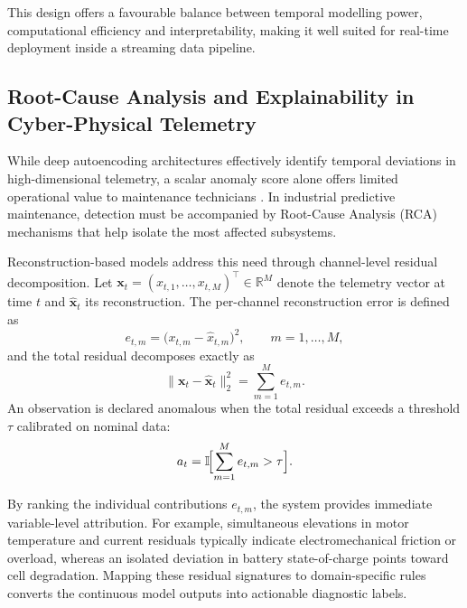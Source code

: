 This design offers a favourable balance between temporal modelling power, computational efficiency and interpretability, making it well suited for real-time deployment inside a streaming data pipeline.

\subsection{Root-Cause Analysis and Explainability in Cyber-Physical Telemetry}
\label{subsec:rca-xai}

While deep autoencoding architectures effectively identify temporal deviations in high-dimensional telemetry, a scalar anomaly score alone offers limited operational value to maintenance technicians \cite{su2019omnianomaly, shen2021interfusion}.
In industrial predictive maintenance, detection must be accompanied by Root-Cause Analysis (RCA) mechanisms that help isolate the most affected subsystems.

Reconstruction-based models address this need through channel-level residual decomposition.
Let $\mathbf{x}_t = (x_{t,1}, \dots, x_{t,M})^{\top} \in \mathbb{R}^{M}$ denote the telemetry vector at time $t$ and $\hat{\mathbf{x}}_t$ its reconstruction.
The per-channel reconstruction error is defined as
\begin{equation}
    e_{t,m} = \bigl(x_{t,m} - \hat{x}_{t,m}\bigr)^{2}, \qquad m = 1, \dots, M,
    \label{eq:channel_residual_error}
\end{equation}
and the total residual decomposes exactly as
\begin{equation}
    \lVert\mathbf{x}_t - \hat{\mathbf{x}}_t\rVert_{2}^{2} = \sum_{m=1}^{M} e_{t,m}.
    \label{eq:total_residual_decomposition}
\end{equation}
An observation is declared anomalous when the total residual exceeds a threshold $\tau$ calibrated on nominal data:
\begin{equation}
    a_t = \mathbb{I}\!\Bigl[\sum_{m=1}^{M} e_{t,m} > \tau\Bigr].
    \label{eq:anomaly_indicator}
\end{equation}

By ranking the individual contributions $e_{t,m}$, the system provides immediate variable-level attribution.
For example, simultaneous elevations in motor temperature and current residuals typically indicate electromechanical friction or overload, whereas an isolated deviation in battery state-of-charge points toward cell degradation.
Mapping these residual signatures to domain-specific rules converts the continuous model outputs into actionable diagnostic labels.

